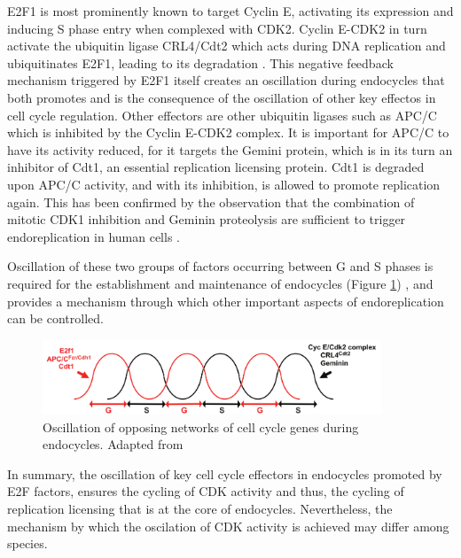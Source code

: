 \documentclass[11pt,twoside,a4paper]{report}
\begin{document}
				E2F1 is most prominently known to target Cyclin E, activating its expression and inducing S phase entry when complexed with CDK2. Cyclin E-CDK2 in turn activate the ubiquitin ligase CRL4/Cdt2 which acts during DNA replication and ubiquitinates E2F1, leading to its degradation \cite{Zielke2011}\cite{Havens2011}\cite{Shibutani2008}. This negative feedback mechanism triggered by E2F1 itself creates an oscillation during endocycles that both promotes and is the consequence of the oscillation of other key effectos in cell cycle regulation. Other effectors are other ubiquitin ligases such as APC/C which is inhibited by the Cyclin E-CDK2 complex. It is important for APC/C to have its activity reduced, for it targets the Gemini protein, which is in its turn an inhibitor of Cdt1, an essential replication licensing protein. Cdt1 is degraded upon APC/C activity, and with its inhibition, is allowed to promote replication again. This has been confirmed by the observation that the combination of mitotic CDK1 inhibition and Geminin proteolysis are sufficient to trigger endoreplication in human cells \cite{Hochegger2007}.
				
				Oscillation of these two groups of factors occurring between G and S phases is required for the establishment and maintenance of endocycles (Figure \ref{fig:oscillation}) \cite{VandenHeuvel2008}\cite{Meserve2012}\cite{Fox2013}, and provides a mechanism through which other important aspects of endoreplication can be controlled.
				
				\begin{figure}[here]
					\centering
					\includegraphics[width=0.9\textwidth]{pngs/oscilation.png}
					\caption[Oscillation of opposing networks of cell cycle genes during endocycles]
					{Oscillation of opposing networks of cell cycle genes during endocycles. {\footnotesize Adapted from \cite{Fox2013}}}
					\label{fig:oscillation}
					\vspace{-10pt}
				\end{figure}
								
				In summary, the oscillation of key cell cycle effectors in endocycles promoted by E2F factors, ensures the cycling of CDK activity and thus, the cycling of replication licensing that is at the core of endocycles. Nevertheless, the mechanism by which the oscilation of CDK activity is achieved may differ among species.
\end{document}
